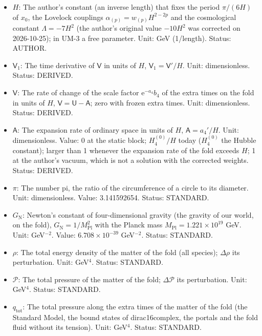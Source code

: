 \documentclass[
  10pt,
]{article}
\providecommand{\tightlist}{%
  \setlength{\itemsep}{0pt}\setlength{\parskip}{0pt}}
\begin{document}
\begin{itemize}
\tightlist
\item
  \(H\): The author's constant (an inverse length) that fixes the period
  \(\pi/(6H)\) of \(x_0\), the Lovelock couplings
  \(\alpha_{(p)} = w_{(p)}H^{2-2p}\) and the cosmological constant
  \(\Lambda = -7H^2\) (the author's original value \(-10H^2\) was
  corrected on 2026-10-25); in UM-3 a free parameter. Unit: GeV
  (1/length). Status: AUTHOR.
\item
  \(\mathsf{V}_1\): The time derivative of \(\mathsf{V}\) in units of
  \(H\), \(\mathsf{V}_1 = \mathsf{V}'/H\). Unit: dimensionless. Status:
  DERIVED.
\item
  \(\mathsf{V}\): The rate of change of the scale factor
  \(\mathrm{e}^{-a_4}b_4\) of the extra times on the fold in units of
  \(H\), \(\mathsf{V} = \mathsf{U} - \mathsf{A}\); zero with frozen
  extra times. Unit: dimensionless. Status: DERIVED.
\item
  \(\mathsf{A}\): The expansion rate of ordinary space in units of
  \(H\), \(\mathsf{A} = a_4'/H\). Unit: dimensionless. Value: 0 at the
  static block; \(H_4^{(0)}/H\) today (\(H_4^{(0)}\) the Hubble
  constant); larger than 1 whenever the expansion rate of the fold
  exceeds \(H\); 1 at the author's vacuum, which is not a solution with
  the corrected weights. Status: DERIVED.
\item
  \(\pi\): The number pi, the ratio of the circumference of a circle to
  its diameter. Unit: dimensionless. Value: 3.141592654. Status:
  STANDARD.
\item
  \(G_{\mathrm{N}}\): Newton's constant of four-dimensional gravity (the
  gravity of our world, on the fold),
  \(G_{\mathrm{N}} = 1/M_{\mathrm{Pl}}^2\) with the Planck mass
  \(M_{\mathrm{Pl}} = 1.221\times10^{19}\) GeV. Unit: GeV\(^{-2}\).
  Value: \(6.708\times10^{-39}\) GeV\(^{-2}\). Status: STANDARD.
\item
  \(\rho\): The total energy density of the matter of the fold (all
  species); \(\Delta\rho\) its perturbation. Unit: GeV\(^4\). Status:
  STANDARD.
\item
  \(\mathcal{P}\): The total pressure of the matter of the fold;
  \(\Delta\mathcal{P}\) its perturbation. Unit: GeV\(^4\). Status:
  STANDARD.
\item
  \(q_{\mathrm{tot}}\): The total pressure along the extra times of the
  matter of the fold (the Standard Model, the bound states of
  dirac16complex, the portals and the fold fluid without its tension).
  Unit: GeV\(^4\). Status: STANDARD.
\end{itemize}
\end{document}
